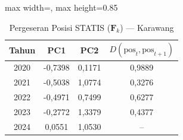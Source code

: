 \begin{table}[H]
\centering
\caption{Pergeseran Posisi STATIS ($\mathbf{F}_k$) --- Karawang} \label{tab:app1jarak_statis_skor_karawang}
\begin{adjustbox}{max width=\textwidth, max height=0.85\textheight}
\begin{tabular}{|c|c|c|c|}
\hline
\textbf{Tahun} & \textbf{PC1} & \textbf{PC2} & \textbf{$D(\text{pos}_t, \text{pos}_{t+1})$} \\
\hline
2020 & -0,7398 & 0,1171 & 0,9889 \\
2021 & -0,5038 & 1,0774 & 0,3276 \\
2022 & -0,4971 & 0,7499 & 0,6277 \\
2023 & -0,2772 & 1,3379 & 0,4377 \\
2024 & 0,0551 & 1,0530 & -- \\
\hline
\end{tabular}
\end{adjustbox}
\end{table}